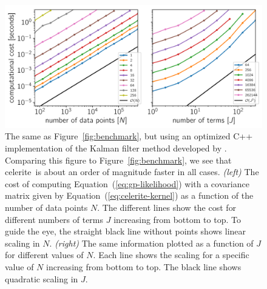 \documentclass[manuscript, letterpaper]{aastex6}
\newcommand{\project}[1]{\textsf{#1}}
\newcommand{\celerite}{\project{celerite}}
\newcommand{\figureref}[1]{\ref{fig:#1}}
\newcommand{\Figure}[1]{Figure~\figureref{#1}}
\newcommand{\figurelabel}[1]{\label{fig:#1}}
\renewcommand{\eqref}[1]{\ref{eq:#1}}
\newcommand{\Eq}[1]{Equation~(\eqref{#1})}
\newcommand{\eq}[1]{\Eq{#1}}
\newcommand{\response}[1]{{\color{blue}#1}}
\begin{document}
\begin{figure}[tp]
\begin{center}
\includegraphics[width=\textwidth]{figures/benchmark_darwin_carma.pdf}
\caption{\response{The same as \Figure{benchmark}, but using an optimized
    \project{C++} implementation of the Kalman filter method developed by
    \citet{Kelly:2014}.
    Comparing this figure to \Figure{benchmark}, we see that \celerite\ is
    about an order of magnitude faster in all cases.
    \emph{(left)} The cost of computing \eq{gp-likelihood} with a covariance
    matrix given by \eq{celerite-kernel} as a function of the number of data
    points $N$.
    The different lines show the cost for different numbers of terms $J$
    increasing from bottom to top.
    To guide the eye, the straight black line without points
    shows linear scaling in $N$.
    \emph{(right)} The same information plotted as a function of $J$ for
    different values of $N$.
    Each line shows the scaling for a specific value of $N$ increasing from
    bottom to top.
    The black line shows quadratic scaling in $J$.}
    \figurelabel{benchmark-carma}}
\end{center}
\end{figure}

\end{document}
